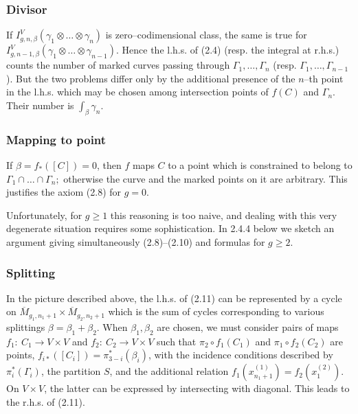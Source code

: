 \documentclass[reqno]{amsart}
\theoremstyle{definition}
\begin{document}

\subsubsection{Divisor}
If $I^V_{g,n,\beta}(\gamma_1\otimes \dots \otimes
\gamma_n)$ is zero--codimensional class, the same is true for
$I^V_{g,n-1,\beta}(\gamma_1 \otimes\dots\otimes \gamma_{n-1})$.
Hence the l.h.s. of (2.4) (resp. the integral at r.h.s.)
counts the number of marked curves passing through
$\Gamma_1,\dots ,\Gamma_n$ (resp. $\Gamma_1, \dots , \Gamma_{n-1}$).
But the two problems differ only by the additional presence of the
$n$--th point in the l.h.s. which may be chosen among
intersection points of $f(C)$ and $\Gamma_n$. Their number is
$\int_{\beta}\gamma_n$.


\subsubsection{Mapping to point}
If $\beta = f_*([C])=0$, then $f$
maps $C$ to a point which is constrained to belong to
$\Gamma_1\cap \dots \cap \Gamma_n;$ otherwise the curve and the marked
points on it are arbitrary. This justifies the axiom (2.8) for $g=0$.

\smallskip

Unfortunately, for $g\ge 1$ this reasoning is too naive, and dealing with this
very degenerate situation requires some sophistication. In 2.4.4 below
we sketch an argument giving simultaneously (2.8)--(2.10)
and formulas for $g\ge 2$.

\medskip

\subsubsection{Splitting}
In the picture described above, the l.h.s. of
(2.11) can be represented by a cycle on $\overline{M}_{g_1,n_1+1}\times
\overline{M}_{g_2,n_2+1}$ which is the sum of cycles corresponding
to various splittings $\beta = \beta_1+\beta_2$. When $\beta_1,\beta_2$
are chosen, we must consider pairs of maps $f_1:\ C_1\to V\times V$
and $f_2:\ C_2\to V\times V$ such that $\pi_2\circ f_1(C_1)$ and
$\pi_1\circ f_2(C_2)$ are points, $f_{i*}([C_i])=\pi^*_{3-i}(\beta_i)$,
with the incidence conditions described by $\pi^*_i(\Gamma_i)$,
the partition $S$, and the additional relation
$f_1(x^{(1)}_{n_1+1})=f_2(x^{(2)}_1)$. On $V\times V$, the latter
can be expressed by intersecting with diagonal. This leads to
the r.h.s. of (2.11).
\end{document}
